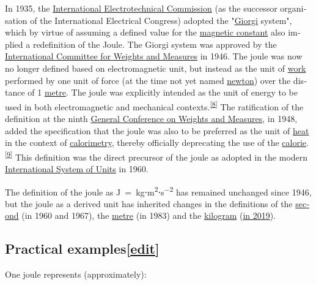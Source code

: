 \documentclass[
]{article}
\newenvironment{LTR}{\beginL}{\endL}
\begin{document}
\begin{LTR}
\begin{otherlanguage}{english}
In 1935, the
\href{/wiki/International_Electrotechnical_Commission}{International
Electrotechnical Commission} (as the successor organisation of the
International Electrical Congress) adopted the
"\href{/wiki/Giovanni_Giorgi}{Giorgi} system", which by virtue of
assuming a defined value for the \href{/wiki/Magnetic_constant}{magnetic
constant} also implied a redefinition of the Joule. The Giorgi system
was approved by the
\href{/wiki/International_Committee_for_Weights_and_Measures}{International
Committee for Weights and Measures} in 1946. The joule was now no longer
defined based on electromagnetic unit, but instead as the unit of
\href{/wiki/Work_(physics)}{work} performed by one unit of force (at the
time not yet named \href{/wiki/Newton_(unit)}{newton}) over the distance
of 1 \href{/wiki/Metre}{metre}. The joule was explicitly intended as the
unit of energy to be used in both electromagnetic and mechanical
contexts.\textsuperscript{\hyperref[cite_note-8]{{[}8{]}}} The
ratification of the definition at the ninth
\href{/wiki/General_Conference_on_Weights_and_Measures}{General
Conference on Weights and Measures}, in 1948, added the specification
that the joule was also to be preferred as the unit of
\href{/wiki/Heat}{heat} in the context of
\href{/wiki/Calorimetry}{calorimetry}, thereby officially deprecating
the use of the
\href{/wiki/Calorie}{calorie}.\textsuperscript{\hyperref[cite_note-9]{{[}9{]}}}
This definition was the direct precursor of the joule as adopted in the
modern \href{/wiki/International_System_of_Units}{International System
of Units} in 1960.

The definition of the joule as
J~=~kg⋅m\textsuperscript{2}⋅s\textsuperscript{−2} has remained unchanged
since 1946, but the joule as a derived unit has inherited changes in the
definitions of the \href{/wiki/Second}{second} (in 1960 and 1967), the
\href{/wiki/Metre}{metre} (in 1983) and the
\href{/wiki/Kilogram}{kilogram}
(\href{/wiki/2019_redefinition_of_the_SI_base_units}{in 2019}).

\subsection[{{{[}}\href{/w/index.php?title=Joule&action=edit&section=3}{{edit}}{{]}}}]{\texorpdfstring{\label{Practical_examples}{Practical
examples}{{{[}}\href{/w/index.php?title=Joule&action=edit&section=3}{{edit}}{{]}}}}{Practical examples{[}edit{]}}}\label{practical-examplesedit}

One joule represents (approximately):


\end{otherlanguage}
\end{LTR}
\end{document}
